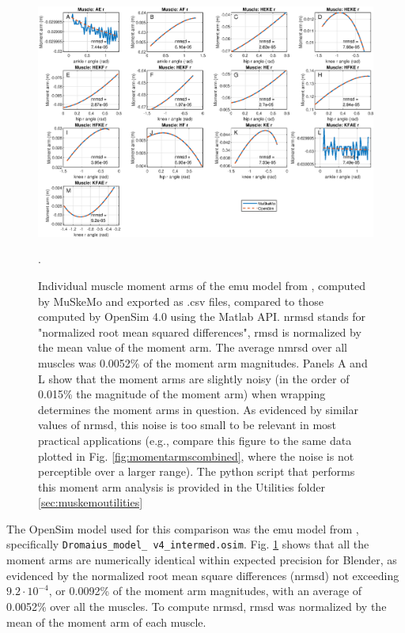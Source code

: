 \documentclass{article}
\begin{document}
\begin{figure}[htbp]
    \centering
    \includegraphics[width=1\textwidth]{figures/emu_momentarms_individual_v2.eps} %
    \caption{Individual muscle moment arms of the emu model from \cite{vanbijlertMusclecontrolledPhysicsSimulations2024a}, computed by MuSkeMo and exported as .csv files, compared to those computed by OpenSim 4.0 using the Matlab API. nrmsd stands for "normalized root mean squared differences", rmsd is normalized by the mean value of the moment arm. The average nmrsd over all muscles was 0.0052\% of the moment arm magnitudes.
    Panels A and L show that the moment arms are slightly noisy (in the order of 0.015\% the magnitude of the moment arm) when wrapping determines the moment arms in question. As evidenced by similar values of nrmsd, this noise is too small to be relevant in most practical applications (e.g., compare this figure to the same data plotted in Fig. \ref{fig:momentarmscombined}, where the noise is not perceptible over a larger range).   
    The python script that performs this moment arm analysis is provided in the Utilities folder \ref{sec:muskemoutilities}}.
    \label{fig:momentarmsindividual}
\end{figure}

The OpenSim model used for this comparison was the emu model from \cite{vanbijlertMusclecontrolledPhysicsSimulations2024a}, specifically \texttt{Dromaius\_model\_ \allowbreak v4\_intermed.\allowbreak osim}. Fig. \ref{fig:momentarmsindividual} shows that all the moment arms are numerically identical within expected precision for Blender, as evidenced by the normalized root mean square differences (nrmsd) not exceeding \(9.2 \cdot 10^{-4}\), or 0.0092\% of the moment arm magnitudes, with an average of 0.0052\% over all the muscles. To compute nrmsd, rmsd was normalized by the mean of the moment arm of each muscle.
\end{document}
